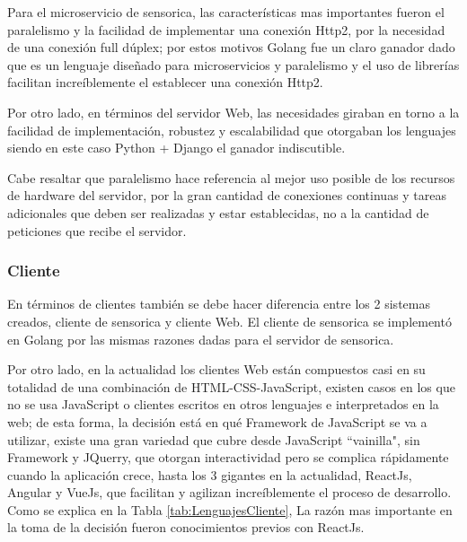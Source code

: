     Para el microservicio de sensorica, las características mas importantes fueron
    el paralelismo y la facilidad de implementar una conexión Http2, por la
    necesidad de una conexión full dúplex; por estos motivos Golang fue un claro
    ganador dado que es un lenguaje diseñado para microservicios y paralelismo y
    el uso de librerías facilitan increíblemente el establecer una conexión Http2.

    Por otro lado, en términos del servidor Web, las necesidades giraban en torno
    a la facilidad de implementación, robustez y escalabilidad que otorgaban los
    lenguajes siendo en este caso Python + Django el ganador indiscutible.


    Cabe resaltar que paralelismo hace referencia al mejor uso posible de los
    recursos de hardware del servidor, por la gran cantidad de conexiones
    continuas y tareas adicionales que deben  ser realizadas y estar
    establecidas, no a la cantidad de peticiones que recibe el servidor.

    \subsubsection{Cliente}

    En términos de clientes también se debe hacer diferencia entre los 2 sistemas
    creados, cliente de sensorica y cliente Web. El cliente de sensorica se
    implementó en Golang por las mismas razones dadas para el servidor de sensorica.

    Por otro lado, en la actualidad los clientes Web están compuestos casi en
    su totalidad de una combinación de HTML-CSS-JavaScript, existen casos en los
    que no se usa JavaScript o clientes escritos en otros lenguajes e interpretados
    en la web; de esta forma, la decisión está en qué Framework de JavaScript se
    va a utilizar, existe una gran variedad que cubre desde JavaScript ``vainilla",
    sin Framework y JQuerry, que otorgan interactividad pero se complica rápidamente
    cuando la aplicación crece, hasta los 3 gigantes en la actualidad, ReactJs,
    Angular y VueJs, que facilitan y agilizan increíblemente el proceso de desarrollo.
    Como se explica en la Tabla \ref{tab:LenguajesCliente}, La razón mas importante
    en la toma de la decisión fueron conocimientos previos con ReactJs.


